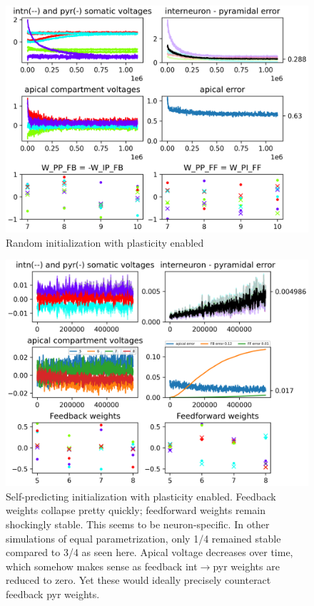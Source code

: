 \documentclass[12pt,a4paper,titlepage]{report}
\begin{document}
\begin{figure}
	\centerline{\includegraphics[width={1\linewidth}]{random_plastic.png}}
	\caption{Random initialization with plasticity enabled}
\end{figure}

\begin{figure}
	\centerline{\includegraphics[width={1\linewidth}]{weird.png}}
	\caption{Self-predicting initialization with plasticity enabled. Feedback weights collapse pretty quickly; feedforward weights remain shockingly stable. This seems to be neuron-specific. In other simulations of equal parametrization, only 1/4 remained stable compared to 3/4 as seen here. Apical voltage decreases over time, which somehow makes sense as feedback int$\rightarrow$pyr weights are reduced to zero. Yet these would ideally precisely counteract feedback pyr weights.}
\end{figure}
\end{document}
